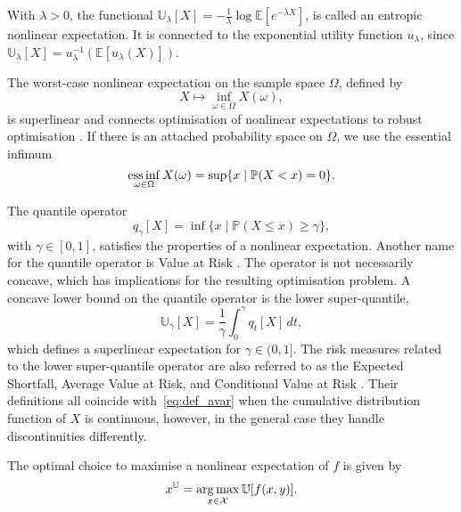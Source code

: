\documentclass[main.tex]{subfiles}
\begin{document}
\begin{example}
  With $\lambda>0$, the functional
  $\mathbb{U}_\lambda[X]=-\frac{1}{\lambda}\log\mathbb{E}[e^{-\lambda
    X}]$, is called an entropic nonlinear expectation.
  It is connected to the exponential utility function $u_\lambda$, since
  $\mathbb{U}_\lambda[X]= u_\lambda^{-1}(\mathbb{E}[u_\lambda(X)])$.

  The worst-case nonlinear expectation on the sample space $\Omega$,
  defined by
  \begin{equation}
    X\mapsto  \inf_{\omega\in\Omega}X(\omega),
  \end{equation}
  is superlinear and
  connects optimisation of nonlinear expectations to robust optimisation \citep{ben2009robust}.
  If there is an attached
  probability space on $\Omega$,
  we use the essential infimum
  \begin{equation}
    \operatorname*{ess\,inf}_{\omega\in\Omega} X(\omega) = \sup\{x \mid
    \mathbb{P}(X<x)=0\}.
  \end{equation}

  The quantile operator
  \begin{equation}
    q_\gamma[X] = \inf\{x\mid\mathbb{P}(X\leq x)\geq
    \gamma\},
  \end{equation}
  with $\gamma\in[0,1]$, satisfies the properties of a
  nonlinear expectation.
  Another name for the quantile operator is Value at Risk \citep{follmer2004stochastic}.
  The operator is not necessarily concave, which has
  implications for the resulting optimisation problem.
  A concave lower bound on the quantile operator is
  the lower super-quantile,
  \begin{equation}\label{eq:def_avar}
    \mathbb{U}_\gamma[X]=\frac{1}{\gamma}\int_0^\gamma q_t[X]\, dt,
  \end{equation}
  which defines a superlinear expectation for $\gamma\in(0,1]$.
  The risk measures related to the lower super-quantile operator are also referred to as
  the Expected Shortfall, Average Value at Risk, and Conditional Value at Risk
  \citep{artzner1999coherent,rockafellar2002conditional,follmer2004stochastic,rockafellar2013fundamental}.
  Their definitions all coincide with~\eqref{eq:def_avar} when the
  cumulative distribution function of $X$ is continuous, however, in
  the general case they handle discontinuities differently.
\end{example}


\begin{problem}
  The optimal choice to maximise a nonlinear expectation
  of $f$ is given by
  \begin{align}
    x^{\mathbb{U}}=\operatorname*{arg\,max}_{x\in\mathcal{X}} \mathbb{U}[f(x,y)].
  \end{align}
\end{problem}
\end{document}
